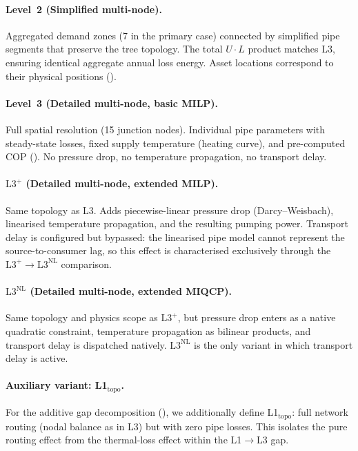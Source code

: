 \documentclass[a4paper,fleqn]{cas-dc}
\newcommand{\Lplus}{\mathrm{L3}^{+}}
\newcommand{\Lnl}{\mathrm{L3}^{\mathrm{NL}}}
\begin{document}
\paragraph{Level~2 (Simplified multi-node).}
Aggregated demand zones (7 in the primary case) connected by
simplified pipe segments that preserve the tree topology. The total
$U \cdot L$ product matches L3, ensuring identical aggregate annual
loss energy. Asset locations correspond to their physical positions
().

\paragraph{Level~3 (Detailed multi-node, basic MILP).}
Full spatial resolution (15 junction nodes). Individual pipe
parameters with steady-state losses, fixed supply temperature
(heating curve), and pre-computed COP (). No pressure
drop, no temperature propagation, no transport delay.

\paragraph{$\Lplus$ (Detailed multi-node, extended MILP).}
Same topology as L3. Adds piecewise-linear pressure drop
(Darcy--Weisbach), linearised temperature propagation, and the
resulting pumping power. Transport delay is configured but bypassed:
the linearised pipe model cannot represent the source-to-consumer
lag, so this effect is characterised exclusively through the
$\Lplus\!\to\!\Lnl$ comparison.

\paragraph{$\Lnl$ (Detailed multi-node, extended MIQCP).}
Same topology and physics scope as $\Lplus$, but pressure drop
enters as a native quadratic constraint, temperature propagation as
bilinear products, and transport delay is dispatched natively.
$\Lnl$ is the only variant in which transport delay is active.

\paragraph{Auxiliary variant: L1$_{\mathrm{topo}}$.}
For the additive gap decomposition (),
we additionally define L1$_{\mathrm{topo}}$: full network routing
(nodal balance as in L3) but with zero pipe losses. This isolates
the pure routing effect from the thermal-loss effect within the
L1$\to$L3 gap.
\end{document}
